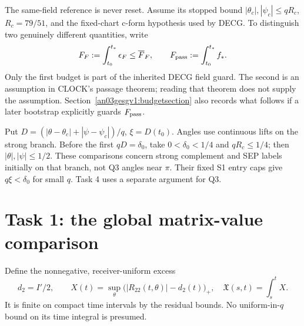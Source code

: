 \documentclass[11pt]{article}
\theoremstyle{remark}\newtheorem{remark}[proposition]{Remark}
\begin{document}
The same-field reference is never reset. Assume its stopped
bound $|\theta_c|,|\psi_c|\le qR_c$, $R_c=79/51$, and
the fixed-chart c-form hypothesis used by DECG. To distinguish
two genuinely different quantities, write
\[
 F_F:=\int_{t_0}^{t_*}\epsilon_F\le\overline F_F,
 \qquad F_{\rm pass}:=\int_{t_0}^{t_*}f_*.
\]
Only the first budget is part of the inherited DECG field
guard. The second is an assumption in CLOCK's passage theorem;
reading that theorem does not supply the assumption.
Section~\ref{an03gesgv1:budgetsection} also records what follows
if a later bootstrap explicitly guards $F_{\rm pass}$.

Put $D=(|\theta-\theta_c|+|\psi-\psi_c|)/q$, $\xi=D(t_0)$.
Angles use continuous lifts on the strong branch. Before the
first $qD=\delta_0$, take $0<\delta_0<1/4$ and $qR_c\le1/4$;
then $|\theta|,|\psi|\le1/2$. These comparisons concern strong
complement and SEP labels initially on that branch, not Q3
angles near $\pi$. Their fixed S1 entry caps give
$q\xi<\delta_0$ for small $q$. Task 4 uses a separate argument for Q3.

\section{Task 1: the global matrix-value comparison}
Define the nonnegative, receiver-uniform excess
\begin{equation}
 d_2=I'/2,\qquad
 X(t)=\sup_\theta\bigl(|R_{22}(t,\theta)|-d_2(t)\bigr)_+,
 \quad \mathfrak X(s,t)=\int_s^t X.
 \label{an03gesgv1:X}
\end{equation}
It is finite on compact time intervals by the residual bounds.
No uniform-in-$q$ bound on its time integral is presumed.
\end{document}
